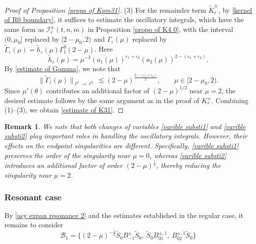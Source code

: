 \documentclass[reqno, 11pt]{amsart}
\newtheorem{remark}[definition]{Remark}
\newcommand\mcaI{\mathcal{I}}
\newcommand\mcaB{\mathcal{B}}
\numberwithin{equation}{section}
\begin{document}
\begin{proof}[Proof of Proposition \ref{propo of Kpm31}]
(3) For the remainder term $\widetilde{K}^{\pm}_r$, by \eqref{kernel of R0 boundary}, it suffices to estimate the oscillatory integrals, which have the same form as ${\mcaI}^{\pm}_{\varepsilon}(t,n,m)$ in Proposition \ref{propo of K4 0}, with the interval $(0,\mu_0]$ replaced by $[2-\mu_0,2)$ and $\Gamma_\varepsilon(\mu)$ replaced by $\widetilde{\Gamma}_{\varepsilon}(\mu)=\widetilde{h}_{\varepsilon}(\mu)\Gamma^0_1(2-\mu)$. Here  
$$ \widetilde{h}_{\varepsilon}(\mu)=\mu^{-3}(a_1(\mu))^{\varepsilon_1+\varepsilon_2}(a_2(\mu))^{2-(\varepsilon_1+\varepsilon_2)}.
$$
By \eqref{estimate of Gamma}, we note that
\begin{equation*}
\|\widetilde{\Gamma}_{\varepsilon}(\mu)\|_{\ell^2\rightarrow\ell^2}\lesssim (2-\mu)^{\frac{2-(\varepsilon_1+\varepsilon_2)}{2}},\qquad \mu\in[2-\mu_0,2).
\end{equation*}
Since $\mu'(\theta)$ contributes an additional factor of $(2-\mu)^{1/2}$ near $\mu=2$, the desired estimate follows by the same argument as in the proof of $K^{\pm}_r$. Combining (1)--(3), we obtain \eqref{estimate of K31}.
\end{proof}
\begin{remark}
{\rm We note that both changes of variables \eqref{varible substi1} and \eqref{varible substi2} play important roles in handling the oscillatory integrals. However, their effects on the endpoint singularities are different. Specifically, \eqref{varible substi1} preserves the order of the singularity near $\mu=0$, whereas \eqref{varible substi2} introduces an additional factor of order $(2-\mu)^{\frac{1}{2}}$, thereby reducing the singularity near $\mu=2$.
}
\end{remark}

\subsubsection{{\bf {Resonant case}}} By \eqref{asy expan resonance 2} and the estimates established in the regular case, it remains to consider
\begin{equation*}
    \mcaB_{1}=\{(2-\mu)^{-\frac{1}{2}}\widetilde{S}_0B^{\pm}_{-1}\widetilde{S}_0,\ \widetilde{S}_0B^{\pm,1}_{01},\ B^{\pm,1}_{02}\widetilde{S}_0\}
\end{equation*}
\end{document}
